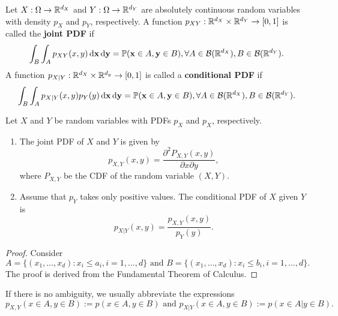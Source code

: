 \begin{definition}
 Let $X:\Omega\to\mathbb{R}^{d_X}$ and $Y:\Omega\to\mathbb{R}^{d_Y}$ are absolutely continuous random variables with density $p_X$ and $p_Y$, respectively. A function $p_{XY}:\mathbb{R}^{d_X}\times \mathbb{R}^{d_Y}\to[0,1]$ is called the \textbf{joint PDF} if
 \begin{equation}
  \int_B\int_{A}p_{XY}(x,y)\,\mathrm{d}\mathbf{x}\,\mathrm{d}\mathbf{y} = \mathbb{P}(\mathbf{x}\in A, \mathbf{y}\in B),\forall A\in\mathcal{B}(\mathbb{R}^{d_X}), B\in\mathcal{B}(\mathbb{R}^{d_Y}).
 \end{equation}
 A function $p_{X|Y}:\mathbb{R}^{d_X} \times \mathbb{R}^{d_y} \to[0,1]$ is called a \textbf{conditional PDF} if
 \begin{equation}
  \int_B \int_{A}p_{X|Y}(x, y) p_Y(y) \,\mathrm{d}\mathbf{x} \,\mathrm{d}\mathbf{y}  = \mathbb{P}(\mathbf{x}\in A , \mathbf{y}\in B), \forall A\in\mathcal{B}(\mathbb{R}^{d_X}), B\in\mathcal{B}(\mathbb{R}^{d_Y}).
 \end{equation}
\end{definition}

\begin{theorem}
 \label{theorem:algebra-of-density-functions}
 Let $X$ and $Y$ be random variables with PDFs $p_X$ and $p_X$, respectively.
 \begin{enumerate}[label=(\roman*), ref=(\roman*)]
  \item The joint PDF of $X$ and $Y$ is given by
        \begin{equation}
         p_{X,Y}(x,y)=\dfrac{\partial^2 P_{X,Y}(x,y)}{\partial x\partial y},
        \end{equation}
        where $P_{X,Y}$ be the CDF of the random variable $(X,Y)$.
  \item Assume that $p_Y$ takes only positive values. The conditional PDF of $X$ given $Y$ is
        \begin{equation}
         p_{X|Y}(x,y)=\dfrac{p_{X,Y}(x,y)}{p_Y(y)}.
        \end{equation}
 \end{enumerate}
\end{theorem}
\begin{proof}
 Consider
 $$A=\{(x_1,\ldots,x_d): x_i\le a_i, i=1,\ldots,d\} \text{ and } B=\{(x_1,\ldots,x_d): x_i\le b_i, i=1,\ldots,d\}.$$
 The proof is derived from the Fundamental Theorem of Calculus.
\end{proof}

\begin{remark}
 If there is no ambiguity, we usually abbreviate the expressions
 $$p_{X,Y}(x\in A,y\in B) := p(x\in A,y\in B) \text{ and } p_{X|Y}(x\in A,y\in B) := p(x\in A|y\in B).$$
\end{remark}

